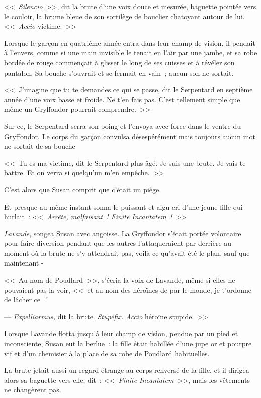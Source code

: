 <<~\emph{Silencio}~>>, dit la brute d'une voix douce et mesurée, baguette pointée vers le couloir, la brume bleue de son sortilège de bouclier chatoyant autour de lui. <<~\emph{Accio} victime.~>>

Lorsque le garçon en quatrième année entra dans leur champ de vision, il pendait à l'envers, comme si une main invisible le tenait en l'air par une jambe, et sa robe bordée de rouge commençait à glisser le long de ses cuisses et à révéler son pantalon. Sa bouche s'ouvrait et se fermait en vain~; aucun son ne sortait.

<<~J'imagine que tu te demandes ce qui se passe, dit le Serpentard en septième année d'une voix basse et froide. Ne t'en fais pas. C'est tellement simple que même un Gryffondor pourrait comprendre.~>>

Sur ce, le Serpentard serra son poing et l'envoya avec force dans le ventre du Gryffondor. Le corps du garçon convulsa désespérément mais toujours aucun mot ne sortait de sa bouche

<<~Tu es ma victime, dit le Serpentard plus âgé. Je suis une brute. Je vais te battre. Et on verra si quelqu'un m'en empêche.~>>

C'est alors que Susan comprit que c'était un piège.

Et presque au même instant sonna le puissant et aigu cri d'une jeune fille qui hurlait~: <<~\emph{Arrête, malfaisant~! Finite Incantatem~!}~>>

\emph{Lavande}, songea Susan avec angoisse. La Gryffondor s'était portée volontaire pour faire diversion pendant que les autres l'attaqueraient par derrière au moment où la brute ne s'y attendrait pas, voilà ce qu'avait été le plan, sauf que maintenant -

<<~Au nom de Poudlard~>>, s'écria la voix de Lavande, même si elles ne pouvaient pas la voir, <<~et au nom des héroïnes de par le monde, je t'ordonne de lâcher ce ~!

--- \emph{Expelliarmus,} dit la brute. \emph{Stupéfix. Accio} héroïne stupide.~>>

Lorsque Lavande flotta jusqu'à leur champ de vision, pendue par un pied et inconsciente, Susan eut la berlue~: la fille était habillée d'une jupe or et pourpre vif et d'un chemisier à la place de sa robe de Poudlard habituelles.

La brute jetait aussi un regard étrange au corps renversé de la fille, et il dirigea alors sa baguette vers elle, dit~: <<~\emph{Finite Incantatem}~>>, mais les vêtements ne changèrent pas.

